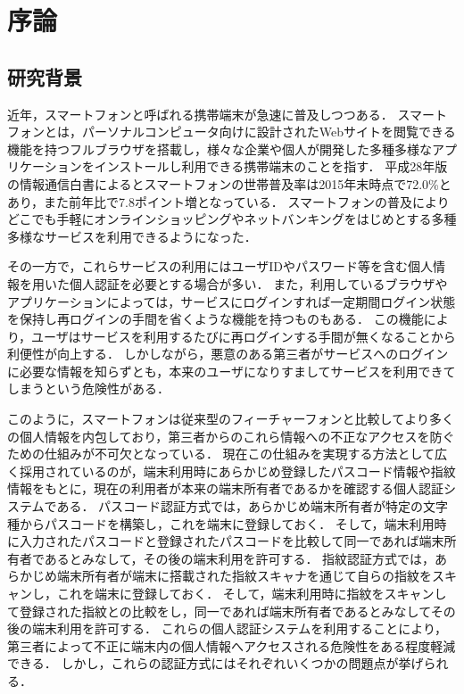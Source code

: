 \chapter{序論}

\section{研究背景}
近年，スマートフォンと呼ばれる携帯端末が急速に普及しつつある．
スマートフォンとは，パーソナルコンピュータ向けに設計されたWebサイトを閲覧できる機能を持つフルブラウザを搭載し，様々な企業や個人が開発した多種多様なアプリケーションをインストールし利用できる携帯端末のことを指す\cite{1-smartphone}．
平成28年版の情報通信白書によるとスマートフォンの世帯普及率は2015年末時点で72.0\%とあり，また前年比で7.8ポイント増となっている\cite{1-spread}．
スマートフォンの普及によりどこでも手軽にオンラインショッピングやネットバンキングをはじめとする多種多様なサービスを利用できるようになった．

その一方で，これらサービスの利用にはユーザIDやパスワード等を含む個人情報を用いた個人認証を必要とする場合が多い．
また，利用しているブラウザやアプリケーションによっては，サービスにログインすれば一定期間ログイン状態を保持し再ログインの手間を省くような機能を持つものもある．
この機能により，ユーザはサービスを利用するたびに再ログインする手間が無くなることから利便性が向上する．
しかしながら，悪意のある第三者がサービスへのログインに必要な情報を知らずとも，本来のユーザになりすましてサービスを利用できてしまうという危険性がある．

このように，スマートフォンは従来型のフィーチャーフォンと比較してより多くの個人情報を内包しており，第三者からのこれら情報への不正なアクセスを防ぐための仕組みが不可欠となっている．
現在この仕組みを実現する方法として広く採用されているのが，端末利用時にあらかじめ登録したパスコード情報や指紋情報をもとに，現在の利用者が本来の端末所有者であるかを確認する個人認証システムである．
パスコード認証方式では，あらかじめ端末所有者が特定の文字種からパスコードを構築し，これを端末に登録しておく．
そして，端末利用時に入力されたパスコードと登録されたパスコードを比較して同一であれば端末所有者であるとみなして，その後の端末利用を許可する．
指紋認証方式では，あらかじめ端末所有者が端末に搭載された指紋スキャナを通じて自らの指紋をスキャンし，これを端末に登録しておく．
そして，端末利用時に指紋をスキャンして登録された指紋との比較をし，同一であれば端末所有者であるとみなしてその後の端末利用を許可する．
これらの個人認証システムを利用することにより，第三者によって不正に端末内の個人情報へアクセスされる危険性をある程度軽減できる．
しかし，これらの認証方式にはそれぞれいくつかの問題点が挙げられる．

